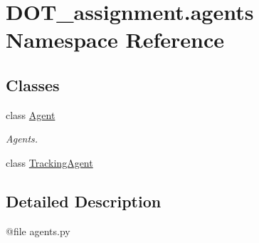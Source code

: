 \hypertarget{namespace_d_o_t__assignment_1_1agents}{}\section{D\+O\+T\+\_\+assignment.\+agents Namespace Reference}
\label{namespace_d_o_t__assignment_1_1agents}
\subsection*{Classes}
\begin{DoxyCompactItemize}
\item 
class \mbox{\hyperlink{class_d_o_t__assignment_1_1agents_1_1_agent}{Agent}}
\begin{DoxyCompactList}\small\item\em Agents. \end{DoxyCompactList}\item 
class \mbox{\hyperlink{class_d_o_t__assignment_1_1agents_1_1_tracking_agent}{Tracking\+Agent}}
\end{DoxyCompactItemize}


\subsection{Detailed Description}
\begin{DoxyVerb}@file agents.py
\end{DoxyVerb}
 